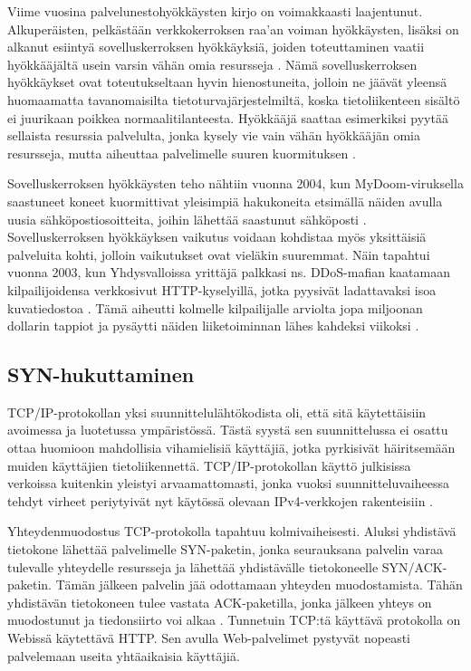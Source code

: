 
Viime vuosina palvelunestohyökkäysten kirjo on voimakkaasti
laajentunut. Alkuperäisten, pelkästään verkkokerroksen raa’an voiman
hyökkäysten, lisäksi on alkanut esiintyä sovelluskerroksen
hyökkäyksiä, joiden toteuttaminen vaatii hyökkääjältä usein varsin
vähän omia resursseja \cite{Hacking}. Nämä sovelluskerroksen
hyökkäykset ovat toteutukseltaan hyvin hienostuneita, jolloin ne
jäävät yleensä huomaamatta tavanomaisilta tietoturvajärjestelmiltä,
koska tietoliikenteen sisältö ei juurikaan poikkea
normaalitilanteesta. Hyökkääjä saattaa esimerkiksi pyytää sellaista
resurssia palvelulta, jonka kysely vie vain vähän hyökkääjän omia
resursseja, mutta aiheuttaa palvelimelle suuren kuormituksen
\cite{DDOSb}.

Sovelluskerroksen hyökkäysten teho nähtiin vuonna 2004, kun
MyDoom-\-viruksella saastuneet koneet kuormittivat yleisimpiä
hakukoneita etsimällä näiden avulla uusia sähköpostiosoitteita, joihin
lähettää saastunut sähköposti \cite{Hacking}. Sovelluskerroksen
hyökkäyksen vaikutus voidaan kohdistaa myös yksittäisiä palveluita
kohti, jolloin vaikutukset ovat vieläkin suuremmat. Näin tapahtui
vuonna 2003, kun Yhdysvalloissa yrittäjä palkkasi ns. DDoS-mafian
kaatamaan kilpailijoidensa verkkosivut HTTP-kyselyillä, jotka pyysivät
ladattavaksi isoa kuvatiedostoa \cite{DDOSb}. Tämä aiheutti kolmelle
kilpailijalle arviolta jopa miljoonan dollarin tappiot ja pysäytti
näiden liiketoiminnan lähes kahdeksi viikoksi \cite{FBI}.

\subsection{SYN-hukuttaminen}
TCP/IP-protokollan yksi suunnittelulähtökodista oli, että sitä
käytettäisiin avoimessa ja luotetussa ympäristössä. Tästä syystä sen
suunnittelussa ei osattu ottaa huomioon mahdollisia vihamielisiä
käyttäjiä, jotka pyrkisivät häiritsemään muiden käyttäjien
tietoliikennettä. TCP/IP-protokollan käyttö julkisissa verkoissa kuitenkin
yleistyi arvaamattomasti, jonka vuoksi suunnitteluvaiheessa tehdyt
virheet periytyivät nyt käytössä olevaan IPv4-verkkojen rakenteisiin
\cite{Hacking}.

Yhteydenmuodostus TCP-protokolla tapahtuu kolmivaiheisesti. Aluksi
yhdistävä tietokone lähettää palvelimelle SYN-paketin, jonka
seurauksana palvelin varaa tulevalle yhteydelle resursseja ja lähettää
yhdistävälle tietokoneelle SYN/ACK-paketin. Tämän jälkeen palvelin
jää odottamaan yhteyden muodostamista. Tähän yhdistävän tietokoneen
tulee vastata ACK-paketilla, jonka jälkeen yhteys on muodostunut ja
tiedonsiirto voi alkaa \cite{Hacking}. Tunnetuin TCP:tä käyttävä
protokolla on Webissä käytettävä HTTP. Sen avulla Web-palvelimet
pystyvät nopeasti palvelemaan useita yhtäaikaisia käyttäjiä.

